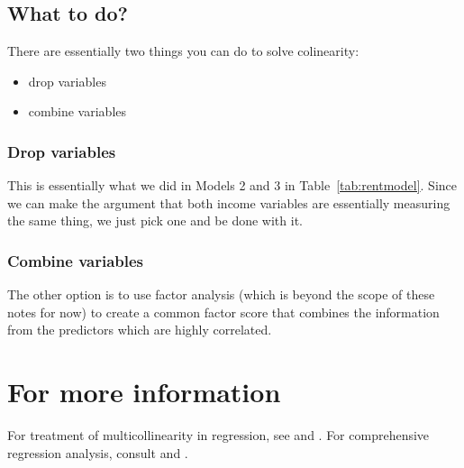 \subsection{What to do?}
There are essentially two things you can do to solve colinearity:
\begin{itemize}
\item{drop variables}
\item{combine variables}
\end{itemize}

\subsubsection{Drop variables}
This is essentially what we did in Models 2 and 3 in Table~\ref{tab:rentmodel}. Since we can make the argument that both income variables are essentially measuring the same thing, we just pick one and be done with it.

\subsubsection{Combine variables}
The other option is to use factor analysis (which is beyond the scope of these notes for now) to create a common factor score that combines the information from the predictors which are highly correlated.

\section*{For more information}
For treatment of multicollinearity in regression, see \citep{fox} and \citep{hill}. For comprehensive regression analysis, consult \citep{agresti} and \citep{cameron2005microeconometrics}.
